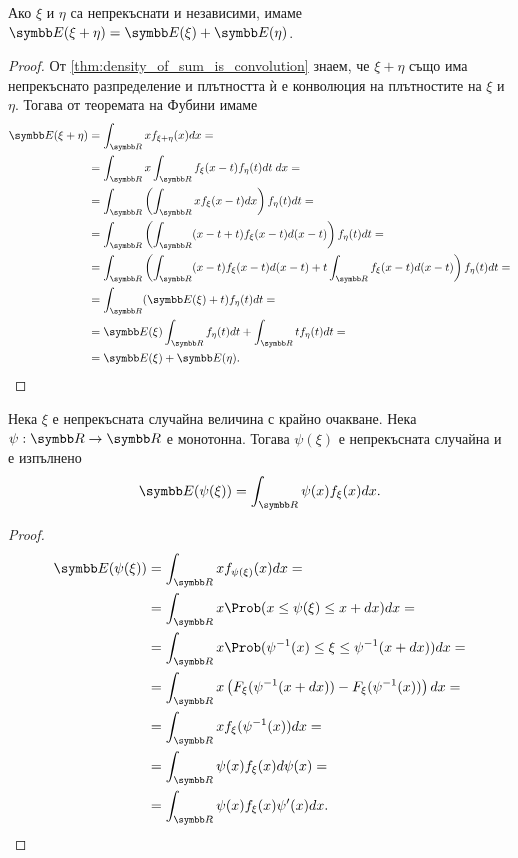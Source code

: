 \documentclass[
  headings=standardclasses,
  bibliography=totocnumbered,
]{scrartcl}
\begin{document}
\begin{proposition}\label{thm:expectation_is_additive}
  Ако \( \xi \) и \( \eta \) са непрекъснати и независими, имаме \( \Expect(\xi + \eta) = \Expect(\xi) + \Expect(\eta) \).
\end{proposition}
\begin{proof}
  От \cref{thm:density_of_sum_is_convolution} знаем, че \( \xi + \eta \) също има непрекъснато разпределение и плътността ѝ е конволюция на плътностите на \( \xi \) и \( \eta \). Тогава от теоремата на Фубини имаме
  \begin{align*}
    \Expect(\xi + \eta)
    &=
    \int_{\R} x f_{\xi + \eta} (x) dx
    = \\ &=
    \int_{\R} x \int_{\R} f_\xi(x - t) f_\eta(t) dt \; dx
    = \\ &=
    \int_{\R} \left( \int_{\R} x f_\xi(x - t) dx \right) f_\eta(t) dt
    = \\ &=
    \int_{\R} \left( \int_{\R} (x - t + t) f_\xi(x - t) d(x - t) \right) f_\eta(t) dt
    = \\ &=
    \int_{\R} \left( \int_{\R} (x - t) f_\xi(x - t) d(x - t) + t \int_{\R} f_\xi(x - t) d(x - t) \right) f_\eta(t) dt
    = \\ &=
    \int_{\R} (\Expect(\xi) + t) f_\eta(t) dt
    = \\ &=
    \Expect(\xi) \int_{\R} f_\eta(t) dt + \int_{\R} t f_\eta(t) dt
    = \\ &=
    \Expect(\xi) + \Expect(\eta).
  \end{align*}
\end{proof}

\begin{proposition}\label{thm:lotus}
  Нека \( \xi \) е непрекъсната случайна величина с крайно очакване. Нека \( \psi: \R \to \R \) е монотонна. Тогава \( \psi(\xi) \) е непрекъсната случайна и е изпълнено
  \begin{equation*}
    \Expect(\psi(\xi))
    =
    \int_{\R} \psi(x) f_\xi(x) dx.
  \end{equation*}
\end{proposition}

\begin{proof}
  \begin{align*}
    \Expect(\psi(\xi))
    &=
    \int_{\R} x f_{\psi(\xi)}(x) dx
    = \\ &=
    \int_{\R} x \Prob(x \leq \psi(\xi) \leq x + dx) dx
    = \\ &=
    \int_{\R} x \Prob(\psi^{-1}(x) \leq \xi \leq \psi^{-1}(x + dx)) dx
    = \\ &=
    \int_{\R} x \left( F_\xi(\psi^{-1}(x + dx)) - F_\xi(\psi^{-1}(x)) \right) dx
    = \\ &=
    \int_{\R} x f_\xi(\psi^{-1}(x)) dx
    = \\ &=
    \int_{\R} \psi(x) f_\xi(x) d \psi(x)
    = \\ &=
    \int_{\R} \psi(x) f_\xi(x) \psi'(x) dx.
  \end{align*}
\end{proof}
\end{document}
